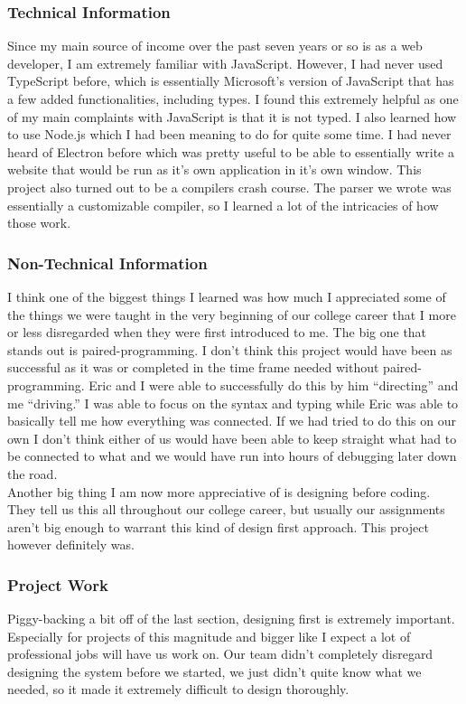 \documentclass[letterpaper,10pt,titlepage,draftclsnofoot,onecolumn,onesided] {IEEEtran}
\begin{document}
\subsubsection{Technical Information}
Since my main source of income over the past seven years or so is as a web developer, I am extremely familiar with JavaScript.
However, I had never used TypeScript before, which is essentially Microsoft's version of JavaScript that has a few added functionalities, including types.
I found this extremely helpful as one of my main complaints with JavaScript is that it is not typed.
I also learned how to use Node.js which I had been meaning to do for quite some time.
I had never heard of Electron before which was pretty useful to be able to essentially write a website that would be run as it's own application in it's own window.
This project also turned out to be a compilers crash course.
The parser we wrote was essentially a customizable compiler, so I learned a lot of the intricacies of how those work.\\

\subsubsection{Non-Technical Information}
I think one of the biggest things I learned was how much I appreciated some of the things we were taught in the very beginning of our college career that I more or less disregarded when they were first introduced to me.
The big one that stands out is paired-programming.
I don't think this project would have been as successful as it was or completed in the time frame needed without paired-programming.
Eric and I were able to successfully do this by him ``directing'' and me ``driving.''
I was able to focus on the syntax and typing while Eric was able to basically tell me how everything was connected.
If we had tried to do this on our own I don't think either of us would have been able to keep straight what had to be connected to what and we would have run into hours of debugging later down the road. \\

Another big thing I am now more appreciative of is designing before coding.
They tell us this all throughout our college career, but usually our assignments aren't big enough to warrant this kind of design first approach.
This project however definitely was.\\

\subsubsection{Project Work}
Piggy-backing a bit off of the last section, designing first is extremely important.
Especially for projects of this magnitude and bigger like I expect a lot of professional jobs will have us work on.
Our team didn't completely disregard designing the system before we started, we just didn't quite know what we needed, so it made it extremely difficult to design thoroughly. \\
\end{document}
